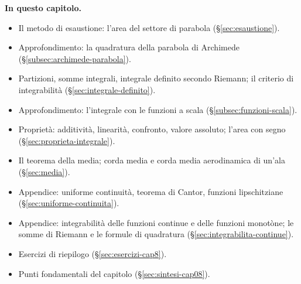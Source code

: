 \medskip
\noindent\textbf{In questo capitolo.}
\begin{itemize}
  \item Il metodo di esaustione: l'area del settore di parabola
  (\S\ref{sec:esaustione}).
  \item Approfondimento: la quadratura della parabola di Archimede
  (\S\ref{subsec:archimede-parabola}).
  \item Partizioni, somme integrali, integrale definito secondo Riemann; il criterio
  di integrabilità (\S\ref{sec:integrale-definito}).
  \item Approfondimento: l'integrale con le funzioni a scala
  (\S\ref{subsec:funzioni-scala}).
  \item Proprietà: additività, linearità, confronto, valore assoluto; l'area con segno
  (\S\ref{sec:proprieta-integrale}).
  \item Il teorema della media; corda media e corda media aerodinamica di un'ala
  (\S\ref{sec:media}).
  \item Appendice: uniforme continuità, teorema di Cantor, funzioni lipschitziane
  (\S\ref{sec:uniforme-continuita}).
  \item Appendice: integrabilità delle funzioni continue e delle funzioni monotòne;
  le somme di Riemann e le formule di quadratura (\S\ref{sec:integrabilita-continue}).
  \item Esercizi di riepilogo (\S\ref{sec:esercizi-cap8}).
  \item Punti fondamentali del capitolo (\S\ref{sec:sintesi-cap08}).
\end{itemize}









